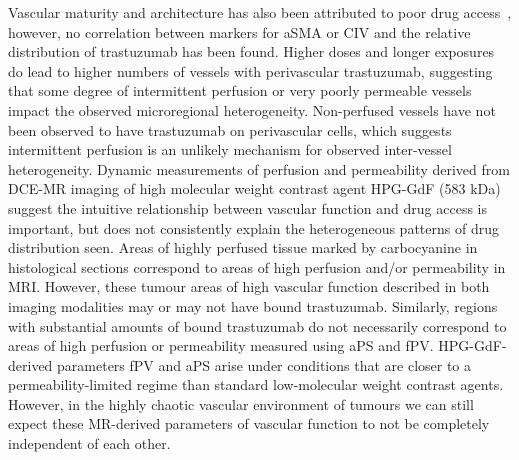 Vascular maturity and architecture has also been attributed to poor drug access~\cite{Goel:2011ku}, however, no correlation between markers for \acs{aSMA} or \acs{CIV} and the relative distribution of trastuzumab has been found.
Higher doses and longer exposures do lead to higher numbers of vessels with perivascular trastuzumab, suggesting that some degree of intermittent perfusion or very poorly permeable vessels impact the observed microregional heterogeneity.
Non-perfused vessels have not been observed to have trastuzumab on perivascular cells, which suggests intermittent perfusion is an unlikely mechanism for observed inter-vessel heterogeneity.
Dynamic measurements of perfusion and permeability derived from DCE-MR imaging of high molecular weight contrast agent \acs{HPG-GdF} (583 kDa) suggest the intuitive relationship between vascular function and drug access is important, but does not consistently explain the heterogeneous patterns of drug distribution seen.
Areas of highly perfused tissue marked by carbocyanine in histological sections correspond to areas of high perfusion and/or permeability in MRI.
However, these tumour areas of high vascular function described in both imaging modalities may or may not have bound trastuzumab.
Similarly, regions with substantial amounts of bound trastuzumab do not necessarily correspond to areas of high perfusion or permeability measured using \acs{aPS} and \acs{fPV}.
HPG-GdF-derived parameters \acs{fPV} and \acs{aPS} arise under conditions that are closer to a permeability-limited regime than standard low-molecular weight contrast agents.
However, in the highly chaotic vascular environment of tumours we can still expect these MR-derived parameters of vascular function to not be completely independent of each other.


